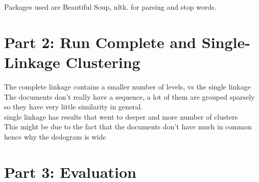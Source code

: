 \documentclass[12pt, oneside]{article}
\begin{document}
Packages used are Beautiful Soup, nltk. for parsing and stop words.

\pagebreak
\section*{Part 2: Run Complete and Single-Linkage Clustering}

The complete linkage contains a smaller number of levels, vs the single linkage\\
The documents don't really have a sequence, a lot of them are grouped
 sparsely so they have very little similarity in general.\\
single linkage has results that went to deeper and more number of clusters\\
This might be due to the fact that the documents don't have much in common hence why the dedogram is wide

\pagebreak
\section*{Part 3: Evaluation}
\end{document}
